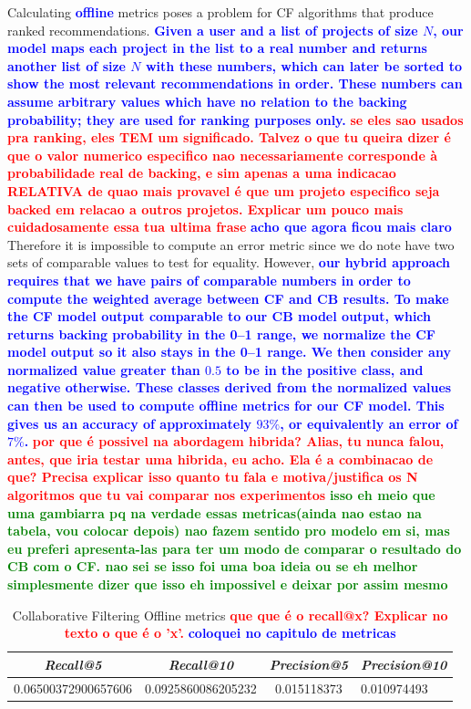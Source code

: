 \documentclass[cic,tc,english]{iiufrgs}
\newcommand{\bruno}[1]{\textcolor{red}{\textbf{#1}}}
\newcommand{\adriano}[1]{\textcolor{blue}{\textbf{#1}}}
\newcommand{\pergunta}[1]{\textcolor{green}{\textbf{#1}}}
\begin{document}
Calculating \adriano{offline} metrics poses a problem for CF algorithms that produce ranked recommendations. \adriano{Given a user and a list of projects of size $N$, our model maps each project in the list to a real number and returns another list of size $N$ with these numbers, which can later be sorted to show the most relevant recommendations in order. These numbers can assume arbitrary values which have no relation to the backing probability; they are used for ranking purposes only.} \bruno{se eles sao usados pra ranking, eles TEM um significado. Talvez o que tu queira dizer é que o valor numerico especifico nao necessariamente corresponde à probabilidade real de backing, e sim apenas a uma indicacao RELATIVA de quao mais provavel é que um projeto especifico seja backed em relacao a outros projetos. Explicar um pouco mais cuidadosamente essa tua ultima frase} \adriano{acho que agora ficou mais claro} Therefore it is impossible to compute an error metric since we do note have two sets of comparable values to test for equality. However, \adriano{our hybrid approach requires that we have pairs of comparable numbers in order to compute the weighted average between CF and CB results. To make the CF model output comparable to our CB model output, which returns backing probability in the 0--1 range, we normalize the CF model output so it also stays in the 0--1 range. We then consider any normalized value greater than $0.5$ to be in the positive class, and negative otherwise. These classes derived from the normalized values can then be used to compute offline metrics for our CF model. This gives us an accuracy of approximately $93\%$, or equivalently an error of $7\%$.}  \bruno{por que é possivel na abordagem hibrida? Alias, tu nunca falou, antes, que iria testar uma hibrida, eu acho. Ela é a combinacao de que? Precisa explicar isso quanto tu fala e motiva/justifica os N algoritmos que tu vai comparar nos experimentos} \pergunta{isso eh meio que uma gambiarra pq na verdade essas metricas(ainda nao estao na tabela, vou colocar depois) nao fazem sentido pro modelo em si, mas eu preferi apresenta-las para ter um modo de comparar o resultado do CB com o CF. nao sei se isso foi uma boa ideia ou se eh melhor simplesmente dizer que isso eh impossivel e deixar por assim mesmo}


\begin{table}[ht!]
    \caption{Collaborative Filtering Offline metrics \bruno{que que é o recall@x? Explicar no texto o que é o 'x'.} \adriano{coloquei no capitulo de metricas}}
    \centering
        \begin{tabular}{c|c|c|p{5cm}}
          \hline
          \textit{Recall@5}  &   \textit{Recall@10}  &   \textit{Precision@5} &   \textit{Precision@10} \\
          \hline
          \hline
          0.06500372900657606           & 0.0925860086205232 &  0.015118373  & 0.010974493  \\
          \hline
        \end{tabular}
    \label{tbl:cf_offline_metrics}
\end{table}
\end{document}
